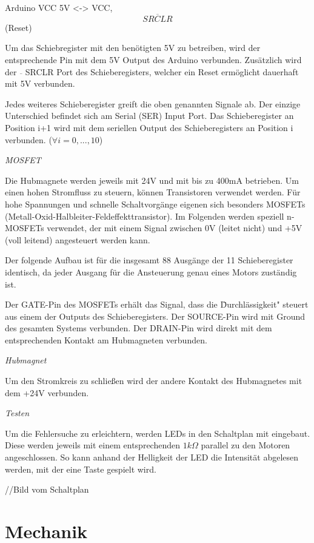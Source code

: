 Arduino VCC 5V <-> VCC, $$\overline{SRCLR}$$ (Reset)

Um das Schiebregister mit den benötigten 5V zu betreiben, wird der entsprechende Pin mit dem 5V Output des Arduino verbunden.
Zusätzlich wird der $\overline{ }$ SRCLR Port des Schieberegisters, welcher ein Reset ermöglicht dauerhaft mit 5V verbunden.

Jedes weiteres Schieberegister greift die oben genannten Signale ab.
Der einzige Unterschied befindet sich am Serial (SER) Input Port.
Das Schieberegister an Position i+1 wird mit dem seriellen Output des Schieberegisters an Position i verbunden. ($\forall i = 0,...,10$)

\textit{MOSFET}

Die Hubmagnete werden jeweils mit 24V und mit bis zu 400mA betrieben.
Um einen hohen Stromfluss zu steuern, können Transistoren verwendet werden.
Für hohe Spannungen und schnelle Schaltvorgänge eigenen sich besonders MOSFETs (Metall-Oxid-Halbleiter-Feldeffekttransistor).
Im Folgenden werden speziell n-MOSFETs verwendet, der mit einem Signal zwischen 0V (leitet nicht) und +5V (voll leitend) angesteuert werden kann.

Der folgende Aufbau ist für die insgesamt 88 Ausgänge der 11 Schieberegister identisch, da jeder Ausgang für die Ansteuerung genau eines Motors zuständig ist.

Der GATE-Pin des MOSFETs erhält das Signal, dass die \"Durchlässigkeit" steuert aus einem der Outputs des Schieberegisters.
Der SOURCE-Pin wird mit Ground des gesamten Systems verbunden.
Der DRAIN-Pin wird direkt mit dem entsprechenden Kontakt am Hubmagneten verbunden.

\textit{Hubmagnet}

Um den Stromkreis zu schließen wird der andere Kontakt des Hubmagnetes mit dem +24V verbunden.

\textit{Testen}

Um die Fehlersuche zu erleichtern, werden LEDs in den Schaltplan mit eingebaut.
Diese werden jeweils mit einem entsprechenden $1k\Omega$ parallel zu den Motoren angeschlossen.
So kann anhand der Helligkeit der LED die Intensität abgelesen werden, mit der eine Taste gespielt wird.

//Bild vom Schaltplan

\section{Mechanik}\label{vorgehenHW}

